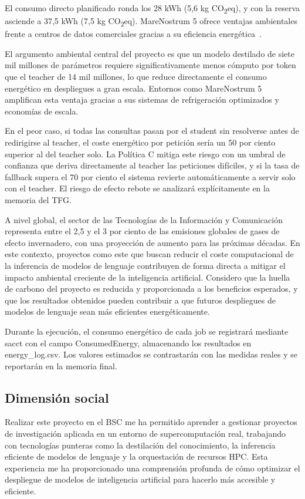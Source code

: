 \documentclass[11pt,a4paper]{article}
\begin{document}
El consumo directo planificado ronda los 28 kWh (5,6 kg CO\textsubscript{2}eq), y con la reserva asciende a 37,5 kWh (7,5 kg CO\textsubscript{2}eq). MareNostrum 5 ofrece ventajas ambientales frente a centros de datos comerciales gracias a su eficiencia energética~\cite{mn5}.

El argumento ambiental central del proyecto es que un modelo destilado de siete mil millones de parámetros requiere significativamente menos cómputo por token que el teacher de 14 mil millones, lo que reduce directamente el consumo energético en despliegues a gran escala. Entornos como MareNostrum 5 amplifican esta ventaja gracias a sus sistemas de refrigeración optimizados y economías de escala.

En el peor caso, si todas las consultas pasan por el student sin resolverse antes de redirigirse al teacher, el coste energético por petición sería un 50 por ciento superior al del teacher solo. La Política C mitiga este riesgo con un umbral de confianza que deriva directamente al teacher las peticiones difíciles, y si la tasa de fallback supera el 70 por ciento el sistema revierte automáticamente a servir solo con el teacher. El riesgo de efecto rebote se analizará explícitamente en la memoria del TFG.

A nivel global, el sector de las Tecnologías de la Información y Comunicación representa entre el 2,5 y el 3 por ciento de las emisiones globales de gases de efecto invernadero, con una proyección de aumento para las próximas décadas. En este contexto, proyectos como este que buscan reducir el coste computacional de la inferencia de modelos de lenguaje contribuyen de forma directa a mitigar el impacto ambiental creciente de la inteligencia artificial. Considero que la huella de carbono del proyecto es reducida y proporcionada a los beneficios esperados, y que los resultados obtenidos pueden contribuir a que futuros despliegues de modelos de lenguaje sean más eficientes energéticamente.

Durante la ejecución, el consumo energético de cada job se registrará mediante sacct con el campo ConsumedEnergy, almacenando los resultados en energy\_log.csv. Los valores estimados se contrastarán con las medidas reales y se reportarán en la memoria final.

\subsection{Dimensión social}

Realizar este proyecto en el BSC me ha permitido aprender a gestionar proyectos de investigación aplicada en un entorno de supercomputación real, trabajando con tecnologías punteras como la destilación del conocimiento, la inferencia eficiente de modelos de lenguaje y la orquestación de recursos HPC. Esta experiencia me ha proporcionado una comprensión profunda de cómo optimizar el despliegue de modelos de inteligencia artificial para hacerlo más accesible y eficiente.
\end{document}
